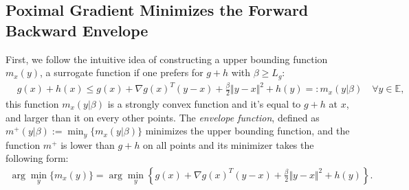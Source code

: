 \documentclass[]{article}
\theoremstyle{definition}
\begin{document}
    \subsection{Poximal Gradient Minimizes the Forward Backward Envelope}
        First, we follow the intuitive idea of constructing a upper bounding function $m_x(y)$, a surrogate function if one prefers for $g + h$ with $\beta \ge L_g$: 
        \begin{align*}
            & g(x) + h(x) \le 
            g(x) + \nabla g(x)^T(y - x) + \frac{\beta}{2} \Vert y - x\Vert^2
            + h(y) =: m_x(y|\beta) \quad \forall y \in \mathbb E, 
        \end{align*}
        this function $m_x(y|\beta)$ is a strongly convex function and it's equal to $g + h$ at $x$, and larger than it on every other points. The \emph{envelope function}, defined as $m^+(y|\beta):= \min_y \{m_x(y|\beta)\}$ minimizes the upper bounding function, and the function $m^+$ is lower than $g + h$ on all points and its minimizer takes the following form: 
        \begin{align*}
            \arg\min_{y} \{m_x(y)\} 
            = \arg\min_{y}\left\lbrace
                g(x) + \nabla g(x)^T(y - x) + \frac{\beta}{2}
                \Vert y - x\Vert^2 + h(y) 
            \right\rbrace. 
        \end{align*}
        
\end{document}

